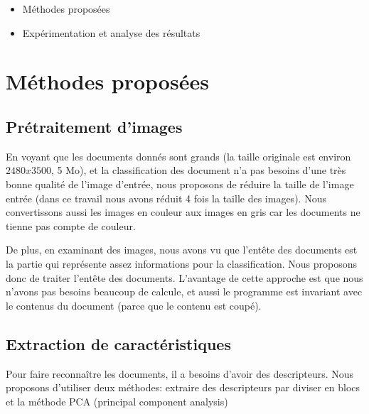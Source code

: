 \documentclass[french,12pt,a4paper,oneside,notitlepage]{report}
\begin{document}
\begin{itemize}
\item Méthodes proposées
\item Expérimentation et analyse des résultats
\end{itemize}

\pagebreak
\section{Méthodes proposées}
\subsection{Prétraitement d'images}
En voyant que les documents donnés sont grands (la taille originale est environ 
$2480x3500$, 5 Mo), et la classification des document n'a pas besoins d’une très bonne 
qualité de l’image d’entrée, nous proposons de réduire la taille de l’image entrée (dans 
ce travail nous avons réduit 4 fois la taille des images). Nous convertissons aussi les images en couleur aux images en gris car les documents ne tienne pas compte de couleur.

De plus, en examinant des images, nous avons vu que l’entête des documents est la
partie qui représente assez informations pour la classification. Nous proposons donc de
traiter l’entête des documents. L’avantage de cette approche est que nous n’avons pas 
besoins beaucoup de calcule, et aussi le programme est invariant avec le contenus du 
document (parce que le contenu est coupé).

\subsection{Extraction de caractéristiques}
Pour faire reconnaître les documents, il a besoins d'avoir des descripteurs. Nous 
proposons d'utiliser deux méthodes: extraire des descripteurs par diviser en blocs et 
la méthode PCA (principal component analysis)
\end{document}
